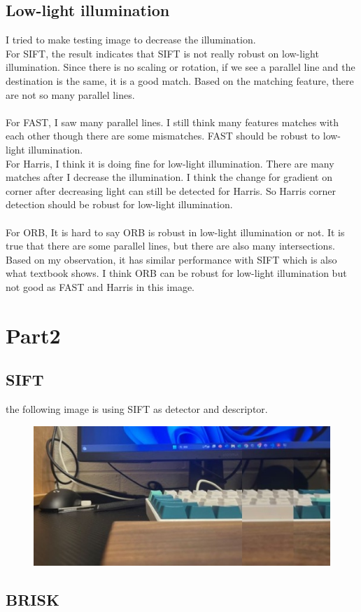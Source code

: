 \documentclass{article}
\begin{document}
\subsection*{Low-light illumination}
I tried to make testing image to decrease the illumination.\\
For SIFT, the result indicates that SIFT is not really robust on low-light illumination.
Since there is no scaling or rotation, if we see a parallel line and the destination is the same, it is a good match.
Based on the matching feature, there are not so many parallel lines.\\
\\
For FAST, I saw many parallel lines.
I still think many features matches with each other though there are some mismatches.
FAST should be robust to low-light illumination.
\\
For Harris, I think it is doing fine for low-light illumination.
There are many matches after I decrease the illumination.
I think the change for gradient on corner after decreasing light can still be detected for Harris.
So Harris corner detection should be robust for low-light illumination.\\
\\
For ORB, It is hard to say ORB is robust in low-light illumination or not.
It is true that there are some parallel lines, but there are also many intersections.
Based on my observation, it has similar performance with SIFT which is also what textbook shows.
I think ORB can be robust for low-light illumination but not good as FAST and Harris in this image.
\section*{Part2}
\subsection*{SIFT}
the following image is using SIFT as detector and descriptor.
\begin{figure}[!ht]
  \begin{center}
    \includegraphics[scale=0.4]{SIFT-result.jpg}
    \label{fig:boat1}
  \end{center} 
\end{figure}

\subsection*{BRISK}
\end{document}
